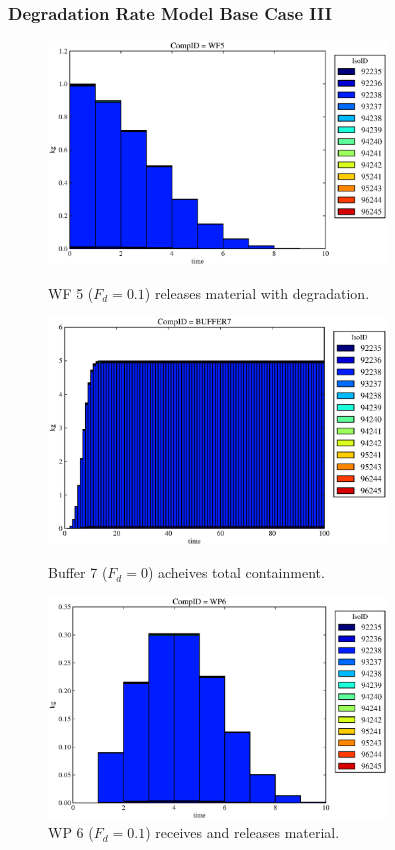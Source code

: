 \begin{frame}
  \frametitle{Degradation Rate Model Base Case III}
  \begin{figure}
\begin{minipage}[b]{0.45\linewidth}

  \includegraphics[width=0.8\textwidth]{./images/drIII1.eps}
  \caption[DRIII WF Contaminants.]{
    WF 5 ($F_d = 0.1$) releases material with degradation. 
    }
  \label{fig:drIIIwf5}
  
  \includegraphics[width=0.8\textwidth]{./images/drIII3.eps}
  \caption[Case DRIII Buffer Contaminants]{
    Buffer 7 ($F_d=0$) acheives total containment.
    }
  \label{fig:drIIIbuff}

\end{minipage}
\hspace{0.05\linewidth}
\begin{minipage}[b]{0.45\linewidth}
  \includegraphics[width=0.8\textwidth]{./images/drIII2.eps}
  \caption[Case DRIII WP Contaminants.]{ 
    WP 6 ($F_d = 0.1$) receives and releases material. 
    }
  \label{fig:drIIIwp6}


\end{minipage}
\end{figure}
\end{frame}

